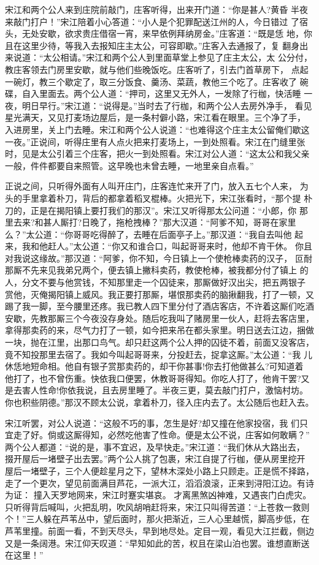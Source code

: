 宋江和两个公人来到庄院前敲门，庄客听得，出来开门道：“你是甚人?黄昏
半夜来敲门打户！”宋江陪着小心答道：“小人是个犯罪配送江州的人，今日错过
了宿头，无处安歇，欲求贵庄借宿一宵，来早依例拜纳房金。”庄客道：“既是恁
地，你且在这里少待，等我入去报知庄主太公，可容即歇。”庄客入去通报了，复
翻身出来说道：“太公相请。”宋江和两个公人到里面草堂上参见了庄主太公，太
公分付，教庄客领去门房里安歇，就与他们些晚饭吃。庄客听了，引去门首草房下，
点起一碗灯，教三个歇定了，取三分饭食、羹汤、菜蔬，教他三个吃了。庄客收了
碗碟，自入里面去。两个公人道：“押司，这里又无外人，一发除了行枷，快活睡
一夜，明日早行。”宋江道：“说得是。”当时去了行枷，和两个公人去房外净手，
看见星光满天，又见打麦场边屋后，是一条村僻小路，宋江看在眼里。三个净了手，
入进房里，关上门去睡。宋江和两个公人说道：“也难得这个庄主太公留俺们歇这
一夜。”正说间，听得庄里有人点火把来打麦场上，一到处照看。宋江在门缝里张
时，见是太公引着三个庄客，把火一到处照看。宋江对公人道：“这太公和我父亲
一般，件件都要自来照管。这早晚也未曾去睡，一地里亲自点看。”

正说之间，只听得外面有人叫开庄门，庄客连忙来开了门，放入五七个人来，
为头的手里拿着朴刀，背后的都拿着稻叉棍棒。火把光下，宋江张看时，“那个提
朴刀的，正是在揭阳镇上要打我们的那汉”。宋江又听得那太公问道：“小郎，你
那里去来?和甚人厮打?日晚了，拖枪拽棒？”那大汉道：“阿爹不知，哥哥在家里
么？”太公道：“你哥哥吃得醉了，去睡在后面亭子上。”那汉道：“我自去叫他
起来，我和他赶人。”太公道：“你又和谁合口，叫起哥哥来时，他却不肯干休。
你且对我说这缘故。”那汉道：“阿爹，你不知，今日镇上一个使枪棒卖药的汉子，
叵耐那厮不先来见我弟兄两个，便去镇上撇科卖药，教使枪棒，被我都分付了镇上
的人，分文不要与他赏钱，不知那里走一个囚徒来，那厮做好汉出尖，把五两银子
赏他，灭俺揭阳镇上威风。我正要打那厮，堪恨那卖药的脑揪翻我，打了一顿，又
踢了我一脚，至今腰里还疼。我已教人四下里分付了酒店客店，不许着这厮们吃酒
安歇，先教那厮三个今夜没存身处。随后吃我叫了赌房里一伙人，赶将去客店里，
拿得那卖药的来，尽气力打了一顿，如今把来吊在都头家里。明日送去江边，捆做
一块，抛在江里，出那口鸟气。却只赶这两个公人押的囚徒不着，前面又没客店，
竟不知投那里去宿了。我如今叫起哥哥来，分投赶去，捉拿这厮。”太公道：“我
儿休恁地短命相。他自有银子赏那卖药的，却干你甚事!你去打他做甚么?可知道着
他打了，也不曾伤重。快依我口便罢，休教哥哥得知。你吃人打了，他肯干罢?又
是去害人性命!你依我说，且去房里睡了。半夜三更，莫去敲门打户，激恼村坊。
你也积些阴德。”那汉不顾太公说，拿着朴刀，径入庄内去了。太公随后也赶入去。

宋江听罢，对公人说道：“这般不巧的事，怎生是好?却又撞在他家投宿，我
们只宜走了好。倘或这厮得知，必然吃他害了性命。便是太公不说，庄客如何敢瞒？”
两个公人都道：“说的是，事不宜迟，及早快走。”宋江道：“我们休从大路出去，
掇开屋后一堵壁子出去罢。”两个公人挑了包裹，宋江自提了行枷，便从房里挖开
屋后一堵壁子，三个人便趁星月之下，望林木深处小路上只顾走。正是慌不择路，
走了一个更次，望见前面满目芦花，一派大江，滔滔浪滚，正来到浔阳江边。有诗
为证：
撞入天罗地网来，宋江时蹇实堪哀。
才离黑煞凶神难，又遇丧门白虎灾。
只听得背后喊叫，火把乱明，吹风胡哨赶将来，宋江只叫得苦道：“上苍救一救则
个！”三人躲在芦苇丛中，望后面时，那火把渐近，三人心里越慌，脚高步低，在
芦苇里撞。前面一看，不到天尽头，早到地尽处。定目一观，看见大江拦截，侧边
又是一条阔港。宋江仰天叹道：“早知如此的苦，权且在梁山泊也罢。谁想直断送
在这里！”

